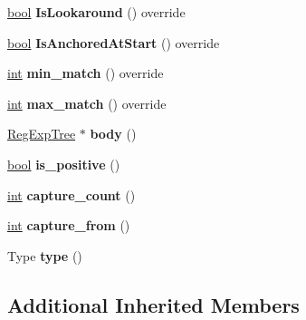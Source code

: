 \begin{DoxyCompactItemize}
\mbox{\hyperlink{classbool}{bool}} {\bfseries Is\+Lookaround} () override
\item 
\mbox{\label{classv8_1_1internal_1_1RegExpLookaround_a16c0ff4325d453275b2c390efbc14a43}} 
\mbox{\hyperlink{classbool}{bool}} {\bfseries Is\+Anchored\+At\+Start} () override
\item 
\mbox{\label{classv8_1_1internal_1_1RegExpLookaround_a15837ba2d732a0809843d745a2e17521}} 
\mbox{\hyperlink{classint}{int}} {\bfseries min\+\_\+match} () override
\item 
\mbox{\label{classv8_1_1internal_1_1RegExpLookaround_af20bddc3c92ef40530b7ee02a6e26b4e}} 
\mbox{\hyperlink{classint}{int}} {\bfseries max\+\_\+match} () override
\item 
\mbox{\label{classv8_1_1internal_1_1RegExpLookaround_ab538d061070c36a13a1e951db73f3915}} 
\mbox{\hyperlink{classv8_1_1internal_1_1RegExpTree}{Reg\+Exp\+Tree}} $\ast$ {\bfseries body} ()
\item 
\mbox{\label{classv8_1_1internal_1_1RegExpLookaround_a3af802a6dffd466eaabbe8e343e9184f}} 
\mbox{\hyperlink{classbool}{bool}} {\bfseries is\+\_\+positive} ()
\item 
\mbox{\label{classv8_1_1internal_1_1RegExpLookaround_a29d3075cfac50bfcf70681cd923b25ff}} 
\mbox{\hyperlink{classint}{int}} {\bfseries capture\+\_\+count} ()
\item 
\mbox{\label{classv8_1_1internal_1_1RegExpLookaround_a37ad3a74be5bfa6d6ba9339e40ea7dff}} 
\mbox{\hyperlink{classint}{int}} {\bfseries capture\+\_\+from} ()
\item 
\mbox{\label{classv8_1_1internal_1_1RegExpLookaround_ae595543691ac367a51658d9be5e3aa5b}} 
Type {\bfseries type} ()
\end{DoxyCompactItemize}
\subsection*{Additional Inherited Members}


